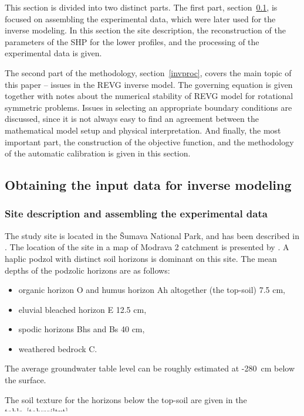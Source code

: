 \documentclass[review]{elsarticle}
\begin{document}
This section is divided into two distinct parts. The first part, section~\ref{assamb}, is focused on assembling the experimental data, which were later used for the inverse modeling. In this section the site description, the reconstruction of the parameters of the SHP for the lower profiles, and the processing of the experimental data is given.   

The second part of the methodology, section~\ref{invproc}, covers the main topic of this paper --  issues in the REVG inverse model. The governing equation is given together with  notes about the numerical stability of 
REVG model for rotational symmetric problems.
Issues in selecting an appropriate boundary conditions are discussed, since it is not always easy to find an agreement between the mathematical model setup and  physical interpretation. And finally, the most important part, the construction of the objective function, and the methodology of the automatic calibration is given in this section. 



\subsection{Obtaining the input data for inverse modeling}
\label{assamb}


\subsubsection{Site description and assembling the experimental data}%
\label{site}
The study site is located in the \v{S}umava National Park, and has been described in \citep{Jacka1}. The location of the site in a map of Modrava 2 catchment is presented by \cite{Jacka2}.
A haplic podzol with distinct soil horizons is dominant on this site. The mean depths of the podzolic horizons are as follows:
\begin{itemize}
\item organic horizon O and humus horizon Ah altogether (the top-soil) 7.5 cm, 
\item eluvial bleached horizon E 12.5 cm, 
\item spodic horizons Bhs and Bs 40 cm,
\item weathered bedrock C.
\end{itemize}
The average groundwater table level can be roughly estimated at -280~cm below the surface. 

The soil texture for the horizons below the top-soil are given in the table~\ref{tab:soiltxt}. 
\end{document}
